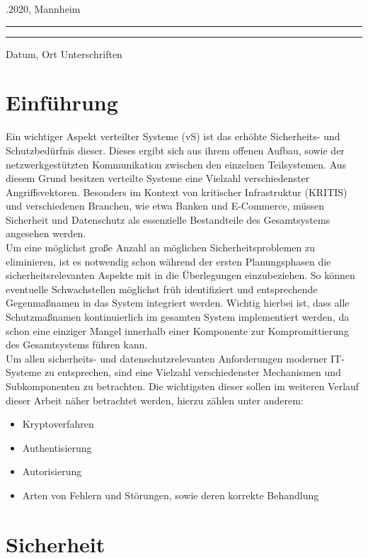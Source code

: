 \documentclass[12pt,a4paper,parskip=half]{scrreprt}
\begin{document}
		\vfill
		.2020, Mannheim \\
		\noindent\rule{5cm}{.4pt}\hfill\rule{5cm}{.4pt}\par
		\noindent Datum, Ort \hfill Unterschriften
		
	\tableofcontents
	
	\chapter{Einführung}
		
		Ein wichtiger Aspekt verteilter Systeme (vS) ist das erhöhte Sicherheits- und Schutzbedürfnis dieser. Dieses ergibt sich aus ihrem offenen Aufbau, sowie der netzwerkgestützten Kommunikation zwischen den einzelnen Teilsystemen. Aus diesem Grund besitzen verteilte Systeme eine Vielzahl verschiedenster Angriffsvektoren. Besonders im Kontext von kritischer Infrastruktur (KRITIS) und verschiedenen Branchen, wie etwa Banken und E-Commerce, müssen Sicherheit und Datenschutz als essenzielle Bestandteile des Gesamtsystems angesehen werden. \\
		Um eine möglichst große Anzahl an möglichen Sicherheitsproblemen zu eliminieren, ist es notwendig schon während der ersten Planungsphasen die sicherheitsrelevanten Aspekte mit in die Überlegungen einzubeziehen. So können eventuelle Schwachstellen möglichst früh identifiziert und entsprechende Gegenmaßnamen in das System integriert werden. Wichtig hierbei ist, dass alle Schutzmaßnamen kontinuierlich im gesamten System implementiert werden, da schon eine einziger Mangel innerhalb einer Komponente zur Kompromittierung des Gesamtsystems führen kann. \\
		Um allen sicherheits- und datenschutzrelevanten Anforderungen moderner IT-Systeme zu entsprechen, sind eine Vielzahl verschiedenster Mechanismen und Subkomponenten zu betrachten. Die wichtigsten dieser sollen im weiteren Verlauf dieser Arbeit näher betrachtet werden, hierzu zählen unter anderem:
		
		\begin{itemize}
			\item Kryptoverfahren
			\item Authentisierung
			\item Autorisierung
			\item Arten von Fehlern und Störungen, sowie deren korrekte Behandlung
		\end{itemize}
		
		
	\chapter{Sicherheit}
		
\end{document}
